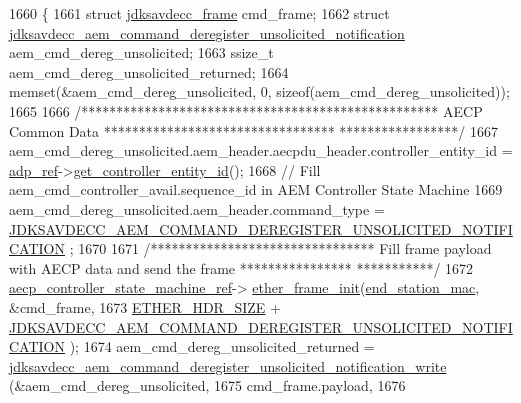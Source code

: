 \begin{DoxyCode}
1660 \{
1661     \textcolor{keyword}{struct }\hyperlink{structjdksavdecc__frame}{jdksavdecc\_frame} cmd\_frame;
1662     \textcolor{keyword}{struct }\hyperlink{structjdksavdecc__aem__command__deregister__unsolicited__notification}{jdksavdecc\_aem\_command\_deregister\_unsolicited\_notification}
       aem\_cmd\_dereg\_unsolicited;
1663     ssize\_t aem\_cmd\_dereg\_unsolicited\_returned;
1664     memset(&aem\_cmd\_dereg\_unsolicited, 0, \textcolor{keyword}{sizeof}(aem\_cmd\_dereg\_unsolicited));
1665 
1666     \textcolor{comment}{/*************************************************** AECP Common Data *********************************
      *****************/}
1667     aem\_cmd\_dereg\_unsolicited.aem\_header.aecpdu\_header.controller\_entity\_id = 
      \hyperlink{classavdecc__lib_1_1end__station__imp_a0b7b5ce956637a18c695ba20f2d4908c}{adp\_ref}->\hyperlink{classavdecc__lib_1_1adp_a0c0959a46658c0a22e9530334b2912da}{get\_controller\_entity\_id}();
1668     \textcolor{comment}{// Fill aem\_cmd\_controller\_avail.sequence\_id in AEM Controller State Machine}
1669     aem\_cmd\_dereg\_unsolicited.aem\_header.command\_type = 
      \hyperlink{group__command_gaf60a3f35dcf29df8b09a17e9278952ae}{JDKSAVDECC\_AEM\_COMMAND\_DEREGISTER\_UNSOLICITED\_NOTIFICATION}
      ;
1670 
1671     \textcolor{comment}{/******************************** Fill frame payload with AECP data and send the frame ****************
      ***********/}
1672     \hyperlink{namespaceavdecc__lib_a0b1b5aea3c0490f77cbfd9178af5be22}{aecp\_controller\_state\_machine\_ref}->
      \hyperlink{classavdecc__lib_1_1aecp__controller__state__machine_a86ff947c5e6b799cfb877d3767bfa1f9}{ether\_frame\_init}(\hyperlink{classavdecc__lib_1_1end__station__imp_a0e9fa7b31d903107ff9e7aac9dac172d}{end\_station\_mac}, &cmd\_frame,
1673                                                         \hyperlink{namespaceavdecc__lib_a6c827b1a0d973e18119c5e3da518e65ca9512ad9b34302ba7048d88197e0a2dc0}{ETHER\_HDR\_SIZE} + 
      \hyperlink{group__command_gaf60a3f35dcf29df8b09a17e9278952ae}{JDKSAVDECC\_AEM\_COMMAND\_DEREGISTER\_UNSOLICITED\_NOTIFICATION}
      );
1674     aem\_cmd\_dereg\_unsolicited\_returned = 
      \hyperlink{group__command__deregister__unsolicited__notification_gafb4ff40967ee883562fc3460d80397c4}{jdksavdecc\_aem\_command\_deregister\_unsolicited\_notification\_write}
      (&aem\_cmd\_dereg\_unsolicited,
1675                                                                                                           
      cmd\_frame.payload,
1676                                                                                                           

\end{DoxyCode}
